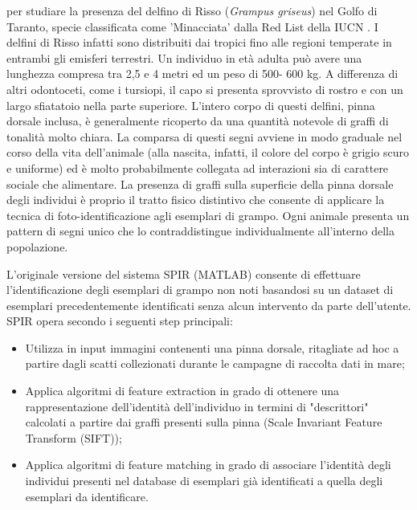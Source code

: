 \documentclass[a4paper,12pt]{report}
\begin{document}
  per studiare la presenza del delfino di Risso (\textit{Grampus griseus}) nel Golfo di Taranto, specie classificata come 'Minacciata' dalla Red List della IUCN \cite{lanfredi2021grampus}. 
  I delfini di Risso infatti sono distribuiti dai 
  tropici fino alle regioni temperate in entrambi gli emisferi terrestri. Un individuo in 
  età adulta può avere una lunghezza compresa tra 2,5 e 4 metri ed un peso di 500-
  600 kg. A differenza di altri odontoceti, come i tursiopi, il capo si presenta sprovvisto di rostro 
  e con un largo sfiatatoio nella parte superiore. L’intero corpo di questi delfini, pinna dorsale 
  inclusa, è generalmente ricoperto da una quantità notevole di graffi di tonalità 
  molto chiara. La comparsa di questi segni avviene in modo graduale nel corso della 
  vita dell’animale (alla nascita, infatti, il colore del corpo è grigio scuro e uniforme) ed è molto probabilmente 
  collegata ad interazioni sia di carattere sociale che alimentare. La presenza di graffi sulla superficie della pinna dorsale degli individui è proprio 
  il tratto fisico distintivo che consente di 
  applicare la tecnica di foto-identificazione agli esemplari di grampo. Ogni animale presenta un pattern di segni unico che lo 
  contraddistingue individualmente all'interno della popolazione.

  L'originale versione del sistema SPIR (MATLAB) consente di effettuare l’identificazione degli esemplari di 
  grampo non noti basandosi su un dataset di esemplari precedentemente identificati senza alcun intervento da parte dell’utente. SPIR opera secondo i seguenti 
  step principali:
  \begin{itemize}
    \item Utilizza in input immagini contenenti una pinna dorsale, ritagliate ad hoc a 
    partire dagli scatti collezionati durante le campagne di raccolta dati
    in mare;      
    \item Applica algoritmi di feature extraction in grado di ottenere una 
    rappresentazione dell’identità dell’individuo in termini di "descrittori" calcolati 
    a partire dai graffi presenti sulla pinna (Scale
    Invariant Feature Transform (SIFT));
    \item Applica algoritmi di feature matching in grado di associare l’identità degli individui presenti 
    nel database di esemplari già identificati a quella degli esemplari da identificare. 
  
  \end{itemize}
\end{document}
